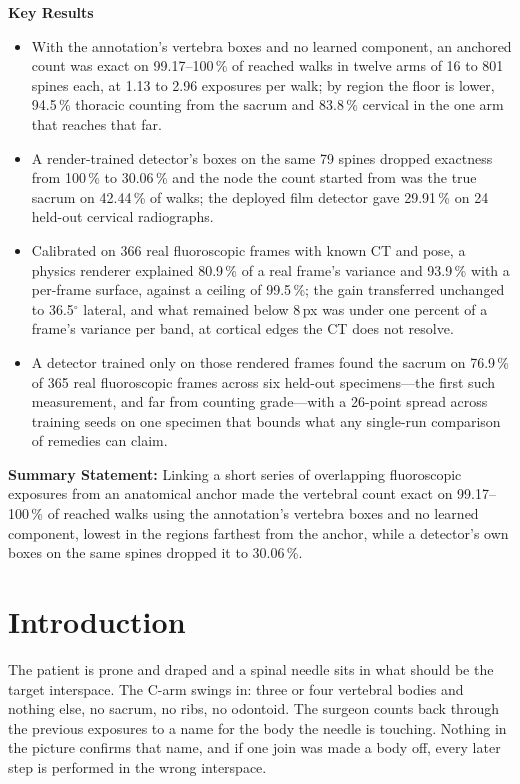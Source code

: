 \documentclass[11pt,letterpaper]{article}
\begin{document}
\medskip
\noindent\textbf{Key Results}
\begin{itemize}\setlength\itemsep{0pt}
\item With the annotation's vertebra boxes and no learned component, an anchored count was exact on
99.17--100\,\% of reached walks in twelve arms of 16 to 801 spines each, at 1.13 to 2.96 exposures per walk;
by region the floor is lower, 94.5\,\% thoracic counting from the sacrum and 83.8\,\% cervical in the one
arm that reaches that far.
\item A render-trained detector's boxes on the same 79 spines dropped exactness from 100\,\% to 30.06\,\%
and the node the count started from was the true sacrum on 42.44\,\% of walks; the deployed film detector
gave 29.91\,\% on 24 held-out cervical radiographs.
\item Calibrated on 366 real fluoroscopic frames with known CT and pose, a physics renderer explained
80.9\,\% of a real frame's variance and 93.9\,\% with a per-frame surface, against a ceiling of 99.5\,\%;
the gain transferred unchanged to 36.5$^\circ$ lateral, and what remained below 8\,px was under one percent
of a frame's variance per band, at cortical edges the CT does not resolve.
\item A detector trained only on those rendered frames found the sacrum on 76.9\,\% of 365 real
fluoroscopic frames across six held-out specimens---the first such measurement, and far from counting
grade---with a 26-point spread across training seeds on one specimen that bounds what any single-run
comparison of remedies can claim.
\end{itemize}

\medskip
\noindent\textbf{Summary Statement:} Linking a short series of overlapping fluoroscopic exposures from an
anatomical anchor made the vertebral count exact on 99.17--100\,\% of reached walks using the annotation's
vertebra boxes and no learned component, lowest in the regions farthest from the anchor, while a detector's
own boxes on the same spines dropped it to 30.06\,\%.

\clearpage

\section*{Introduction}

The patient is prone and draped and a spinal needle sits in what should be the target interspace. The C-arm
swings in: three or four vertebral bodies and nothing else, no sacrum, no ribs, no odontoid. The surgeon
counts back through the previous exposures to a name for the body the needle is touching. Nothing in the
picture confirms that name, and if one join was made a body off, every later step is performed in the wrong
interspace.
\end{document}
